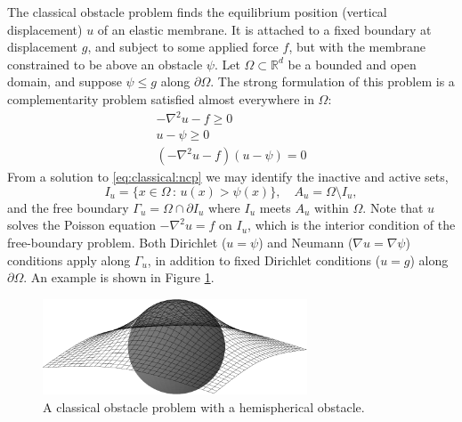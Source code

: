 \documentclass[]{interact}
\theoremstyle{plain}%
\theoremstyle{definition}
\theoremstyle{remark}
\newcommand{\RR}{\mathbb{R}}
\newcommand{\grad}{\nabla}
\begin{document}
The classical obstacle problem \cite{KinderlehrerStampacchia1980} finds the equilibrium position (vertical displacement) $u$ of an elastic membrane.  It is attached to a fixed boundary at displacement $g$, and subject to some applied force $f$, but with the membrane constrained to be above an obstacle $\psi$.  Let $\Omega \subset \RR^d$ be a bounded and open domain, and suppose $\psi \le g$ along $\partial \Omega$.  The strong formulation of this problem is a complementarity problem satisfied almost everywhere in $\Omega$:
\begin{subequations} \label{eq:classical:ncp}
\begin{align}
  -\nabla^2 u - f \geq 0 \label{eq:classical:ncp:a} \\
  u - \psi \geq 0\\
  (-\nabla^2u - f)(u - \psi) = 0 \label{eq:classical:ncp:c}
\end{align}
\end{subequations}
From a solution to \eqref{eq:classical:ncp} we may identify the inactive and active sets,
\begin{equation}
  I_u = \{x \in \Omega \,:\, u(x) > \psi(x)\}, \quad A_u = \Omega \setminus I_u, \label{eq:classical:sets}
\end{equation}
and the free boundary $\Gamma_u = \Omega \cap \partial I_u$ where $I_u$ meets $A_u$ within $\Omega$.  Note that $u$ solves the Poisson equation $-\nabla^2u = f$ on $I_u$, which is the interior condition of the free-boundary problem.  Both Dirichlet ($u=\psi$) and Neumann ($\grad u = \grad \psi$) conditions apply along $\Gamma_u$, in addition to fixed Dirichlet conditions ($u=g$) along $\partial\Omega$.  An example is shown in Figure \ref{fig:ball}.

\begin{figure}[ht]
\centering
\includegraphics[width=0.7\textwidth]{static/obstacle65.pdf}
\caption{A classical obstacle problem with a hemispherical obstacle.}
\label{fig:ball}
\end{figure}
\end{document}
